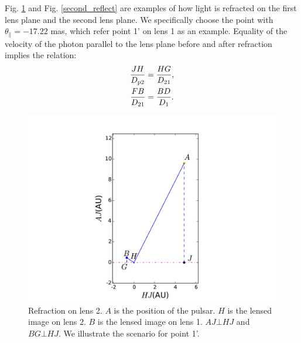 \documentclass[useAMS,usenatbib]{mn2e}
\begin{document}
Fig. \ref{first_reflect} and Fig. \ref{second_reflect} are examples of how light is refracted on the first lens plane and the second lens plane.  We specifically choose the point with $\theta_{\parallel}=-17.22$ mas, which refer point 1' on lens 1 as an example.  
Equality of the velocity of the photon parallel to the lens plane before and after refraction implies the relation:
\begin{equation}
\begin{aligned}
\frac{JH}{D_{\rm p2}}&=\frac{HG}{D_{21}},\\
\frac{FB}{D_{21}}&=\frac{BD}{D_{1}}.
\end{aligned}
\end{equation}


\begin{figure}
\centering
\includegraphics[width=1.0\linewidth,scale=1.0]{First_reflection_Nov25.pdf}
\caption{Refraction on lens 2. 
$A$ is the position of the pulsar.  $H$ is the lensed image on lens 2.  $B$ is
the lensed image on lens 1.  $AJ\bot HJ$ and $BG\bot HJ$.  We illustrate the scenario for point 1'.}
\label{first_reflect}
\end{figure}
\end{document}

